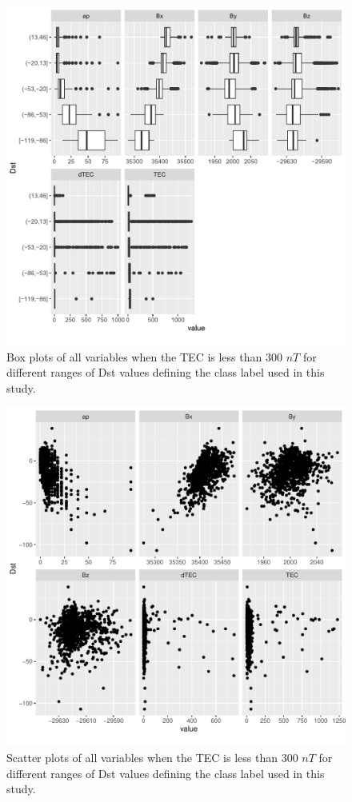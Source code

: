 \documentclass[sn-mathphys-num]{sn-jnl}%
\begin{document}
\begin{figure}
    \centering
    \includegraphics[width=0.9\linewidth]{iono3boxplot_fix.pdf}
    \caption{Box plots of all variables when the TEC is less than $300$ $nT$ for different ranges of Dst values defining the class label used in this study.}
    \label{fig:iono3boxplot}
\end{figure}

\begin{figure}
    \centering
    \includegraphics[width=0.9\linewidth]{iono3scatterplot.pdf}
    \caption{Scatter plots of all variables when the TEC is less than $300$ $nT$ for different ranges of Dst values defining the class label used in this study.}
    \label{fig:iono3scatterplot}
\end{figure}
\end{document}

